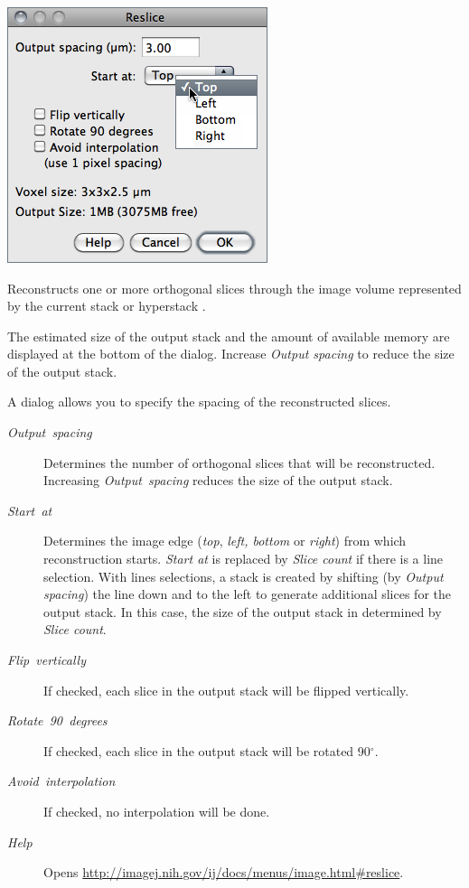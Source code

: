 \subsubsection[{\protect\userinterface{Reslice\ldots{}\ {[}/{]}}}]{\protect{}\label{sub:Reslice...[/]}\improvement{}}

\begin{minipage}[c][1\totalheight][t]{0.41\columnwidth}%
\includegraphics[scale=0.55]{images/Reslice}%
\end{minipage}%
\begin{minipage}[c][1\totalheight][t]{0.59\columnwidth}%
Reconstructs one or more orthogonal slices through the image volume
represented by the current stack or hyperstack \cite{C-Reslice-Zproj}. 

\medskip{}
The estimated size of the output stack and the amount of available
memory are displayed at the bottom of the dialog. Increase \emph{Output
spacing} to reduce the size of the output stack.

\medskip{}
A dialog allows you to specify the spacing of the reconstructed slices.%
\end{minipage}
\begin{description}
\item [{\emph{Output\ spacing}}] Determines the number of orthogonal slices
that will be reconstructed. Increasing\emph{ Output\ spacing} reduces
the size of the output stack. 
\item [{\emph{Start\ at}}] Determines the image edge (\emph{top}, \emph{left,
bottom} or \emph{right}) from which reconstruction starts. \emph{Start
at} is replaced by \emph{Slice count} if there is a line selection.
With lines selections, a stack is created by shifting (by \emph{Output
spacing}) the line down and to the left to generate additional slices
for the output stack. In this case, the size of the output stack in
determined by \emph{Slice count}.
\item [{\emph{Flip\ vertically}}] If checked, each slice in the output
stack will be flipped vertically.
\item [{\emph{Rotate\ 90\ degrees}}] If checked, each slice in the output
stack will be rotated 90$^{\circ}$.
\item [{\emph{Avoid\ interpolation}}] If checked, no interpolation will
be done.
\item [{\emph{Help}}] Opens \url{http://imagej.nih.gov/ij/docs/menus/image.html#reslice}.
\end{description}

